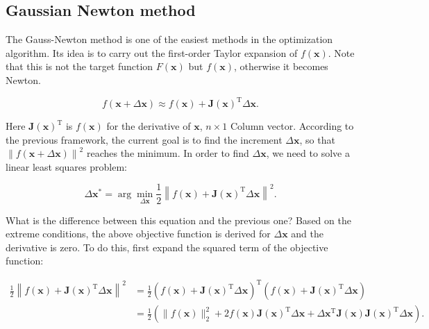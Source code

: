 \subsection{Gaussian Newton method}

The Gauss-Newton method is one of the easiest methods in the optimization algorithm. Its idea is to carry out the first-order Taylor expansion of $f(\bm{x})$. Note that this is not the target function $F(\bm{x})$ but $f(\bm{x})$, otherwise it becomes Newton.

\begin{equation}
\label{eq:approximation}
f\left( {\bm{x} + \Delta \bm{x}} \right) \approx f\left( \bm{x} \right) + \bm{J} \left( \bm{x} \right)^\mathrm{T} \Delta \bm{x}.
\end{equation}

Here $\bm{J}(\bm{x})^\mathrm{T}$ is $f(\bm{x})$ for the derivative of $\bm{x}$, $n \times 1$ Column vector. According to the previous framework, the current goal is to find the increment $\Delta \bm{x}$, so that $\left\| {f\left( \bm{x} + \Delta \bm{x} \right)} \right \|^2$ reaches the minimum. In order to find $\Delta \bm{x}$, we need to solve a linear least squares problem:

\begin{equation}
\Delta \bm{x}^* = \arg \mathop {\min }\limits_{\Delta \bm{x}} \frac{1}{2}{\left\| {f\left( \bm{x} \right) + \bm{J} \left( \bm{x} \right)^\mathrm{T} \Delta \bm{x} } \right\|^2}.
\end{equation}

What is the difference between this equation and the previous one? Based on the extreme conditions, the above objective function is derived for $\Delta \bm{x}$ and the derivative is zero. To do this, first expand the squared term of the objective function:

\begin{align*}
\frac{1}{2}{\left\| {f\left( \bm{x} \right) + \bm{J} \left( \bm{x} \right)^\mathrm{T} \Delta \bm{x}} \right\|^2} &= \frac{1}{2}{\left( {f\left( \bm{x} \right) + \bm{J}\left( \bm{x} \right)^\mathrm{T} \Delta \bm{x}} \right)^\mathrm{T}}\left( {f\left( \bm{x} \right) + \bm{J} \left( \bm{x} \right)^\mathrm{T} \Delta \bm{x}} \right)\\
&= \frac{1}{2}\left( \| f{{\left( \bm{x} \right)}\|^2_2 + 2 f\left( \bm{x} \right) \bm{J} {{\left( \bm{x} \right)}}^\mathrm{T} \Delta \bm{x} + \Delta { \bm{x}^\mathrm{T}}{\bm{J} (\bm{x})} \bm{J}(\bm{x})^\mathrm{T} \Delta \bm{x}} \right).
\end{align*}

